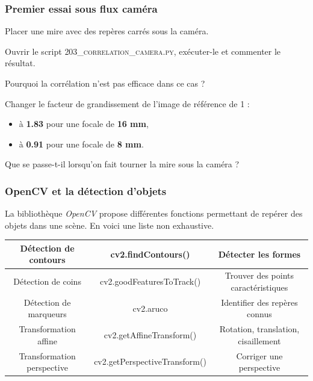 \documentclass[a4paper,12pt,titlepage]{article} %
\begin{document}
\newpage
\subsubsection{Premier essai sous flux caméra}

\Manip Placer une mire avec des repères carrés sous la caméra.

\Manip Ouvrir le script \textsc{203\_correlation\_camera.py}, exécuter-le et commenter le résultat.

\Quest Pourquoi la corrélation n'est pas efficace dans ce cas ?

\Manip Changer le facteur de grandissement de l'image de référence de 1 :

\begin{itemize}
	\item à \textbf{1.83} pour une focale de \textbf{16 mm},
	\item à \textbf{0.91} pour une focale de \textbf{8 mm}.
\end{itemize}

\Quest Que se passe-t-il lorsqu'on fait tourner la mire sous la caméra ? 

\subsubsection{OpenCV et la détection d'objets}

La bibliothèque \textsl{OpenCV} propose différentes fonctions permettant de repérer des objets dans une scène. En voici une liste non exhaustive.

\medskip

\begin{small}
\begin{tabular}{|c|c|c|}
\hline
Détection de contours & cv2.findContours() & Détecter les formes \\
\hline
Détection de coins & cv2.goodFeaturesToTrack() & Trouver des points caractéristiques \\
\hline
Détection de marqueurs & cv2.aruco & Identifier des repères connus \\
\hline
Transformation affine & cv2.getAffineTransform() & Rotation, translation, cisaillement \\
\hline
Transformation perspective & cv2.getPerspectiveTransform() & Corriger une perspective \\
\hline
\end{tabular}
\end{small}


\newpage
\end{document}
